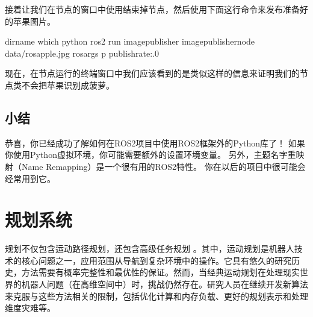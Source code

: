 \documentclass[letterpaper,10pt,english]{sphinxmanual}
\begin{document}
\sphinxAtStartPar
接着让我们在节点的窗口中使用结束掉节点，然后使用下面这行命令来发布准备好的苹果图片。

\begin{sphinxVerbatim}[commandchars=\\\{\}]
dirname which python ros2 run image\PYGZus{}publisher image\PYGZus{}publisher\PYGZus{}node data/ros\PYGZhy{}apple.jpg \PYGZhy{}\PYGZhy{}ros\PYGZhy{}args \PYGZhy{}p publish\PYGZus{}rate:.0
\end{sphinxVerbatim}

\sphinxAtStartPar
现在，在节点运行的终端窗口中我们应该看到的是类似这样的信息来证明我们的节点类不会把苹果识别成菠萝。


\subsection{小结}
\label{\detokenize{chapter_rl_sys/perception_code_ex:id6}}
\sphinxAtStartPar
恭喜，你已经成功了解如何在ROS2项目中使用ROS2框架外的Python库了！
如果你使用Python虚拟环境，你可能需要额外的设置环境变量。
另外，主题名字重映射（Name Remapping）是一个很有用的ROS2特性。
你在以后的项目中很可能会经常用到它。


\section{规划系统}
\label{\detokenize{chapter_rl_sys/planning:id1}}\label{\detokenize{chapter_rl_sys/planning::doc}}
\sphinxAtStartPar
规划不仅包含运动路径规划，还包含高级任务规划
。其中，运动规划是机器人技术的核心问题之一，应用范围从导航到复杂环境中的操作。它具有悠久的研究历史，方法需要有概率完整性和最优性的保证。然而，当经典运动规划在处理现实世界的机器人问题（在高维空间中）时，挑战仍然存在。研究人员在继续开发新算法来克服与这些方法相关的限制，包括优化计算和内存负载、更好的规划表示和处理维度灾难等。
\end{document}
